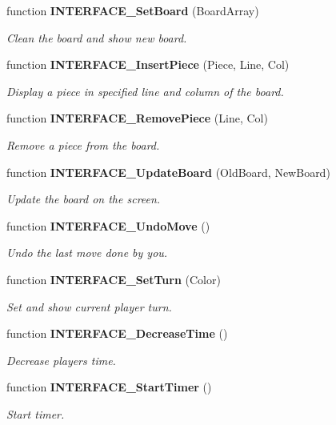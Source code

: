 \begin{CompactItemize}
function {\bf INTERFACE\_\-SetBoard} (BoardArray)
\begin{CompactList}\small\item\em Clean the board and show new board. \item\end{CompactList}\item 
function {\bf INTERFACE\_\-InsertPiece} (Piece, Line, Col)
\begin{CompactList}\small\item\em Display a piece in specified line and column of the board. \item\end{CompactList}\item 
function {\bf INTERFACE\_\-RemovePiece} (Line, Col)
\begin{CompactList}\small\item\em Remove a piece from the board. \item\end{CompactList}\item 
function {\bf INTERFACE\_\-UpdateBoard} (OldBoard, NewBoard)
\begin{CompactList}\small\item\em Update the board on the screen. \item\end{CompactList}\item 
function {\bf INTERFACE\_\-UndoMove} ()
\begin{CompactList}\small\item\em Undo the last move done by you. \item\end{CompactList}\item 
function {\bf INTERFACE\_\-SetTurn} (Color)
\begin{CompactList}\small\item\em Set and show current player turn. \item\end{CompactList}\item 
function {\bf INTERFACE\_\-DecreaseTime} ()
\begin{CompactList}\small\item\em Decrease players time. \item\end{CompactList}\item 
function {\bf INTERFACE\_\-StartTimer} ()
\begin{CompactList}\small\item\em Start timer. \item\end{CompactList}\item 

\end{CompactItemize}
